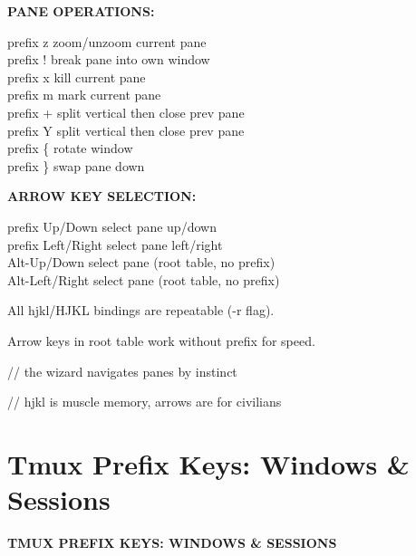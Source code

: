 \documentclass[11pt,a4paper,twoside]{book}
\begin{document}
\vspace{12pt}
{\bfseries\color{neonyellow} PANE OPERATIONS:}\vspace{4pt}

\begin{codebox}
prefix z              zoom/unzoom current pane\\
prefix !              break pane into own window\\
prefix x              kill current pane\\
prefix m              mark current pane\\
prefix +              split vertical then close prev pane\\
prefix Y              split vertical then close prev pane\\
prefix \{              rotate window\\
prefix \}              swap pane down\\
\end{codebox}


\vspace{12pt}
{\bfseries\color{neonyellow} ARROW KEY SELECTION:}\vspace{4pt}

\begin{codebox}
prefix Up/Down        select pane up/down\\
prefix Left/Right     select pane left/right\\
Alt-Up/Down           select pane (root table, no prefix)\\
Alt-Left/Right        select pane (root table, no prefix)\\
\end{codebox}

All hjkl/HJKL bindings are repeatable (-r flag).

Arrow keys in root table work without prefix for speed.

// the wizard navigates panes by instinct

// hjkl is muscle memory, arrows are for civilians


\vspace{16pt}

\section{Tmux Prefix Keys: Windows \& Sessions}


\vspace{10pt}
{\large\bfseries\color{neoncyan} TMUX PREFIX KEYS: WINDOWS \& SESSIONS}\vspace{6pt}
\end{document}
